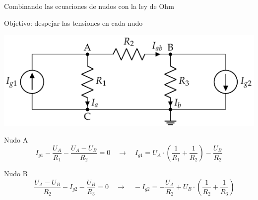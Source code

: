 \documentclass[aspectratio=169, xcolor={usenames,svgnames,dvipsnames}]{beamer}
\begin{document}
\begin{frame}{Combinando las ecuaciones de nudos con la ley de Ohm}

    \vspace{3mm}
    \alert{Objetivo}: despejar las \alert{tensiones en cada nudo}
    
    \vspace{-2mm}
    \begin{center}
    \includegraphics[width=.7\linewidth]{../figs/nudos.pdf}
    \end{center}
    
    \vspace{-4mm}
    
    Nudo A
    \begin{equation*}
      I_{g1} - \dfrac{U_A}{R_1} - \dfrac{U_A - U_B}{R_2} = 0 \quad \rightarrow \quad I_{g1} = U_A\cdot\left(\dfrac{1}{R_1}+\dfrac{1}{R_2}\right) - \dfrac{U_B}{R_2} 
    \end{equation*}
    
    Nudo B
    \begin{equation*}
      \quad\;\; \dfrac{U_A - U_B}{R_2} - I_{g2} - \dfrac{U_B}{R_3} = 0 \quad \rightarrow \quad - I_{g2} = - \dfrac{U_A}{R_2} + U_B \cdot\left(\dfrac{1}{R_2} + \dfrac{1}{R_3}\right)
    \end{equation*}
\end{frame}

\end{document}
